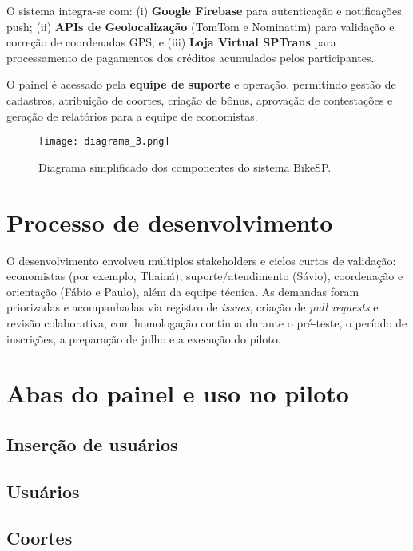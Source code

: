 O sistema integra-se com: (i) \textbf{Google
Firebase} para autenticação e notificações push; (ii) \textbf{APIs de
Geolocalização} (TomTom e Nominatim) para validação e correção de coordenadas
GPS; e (iii) \textbf{Loja Virtual SPTrans} para processamento de pagamentos dos
créditos acumulados pelos participantes.

O painel é acessado pela \textbf{equipe de suporte} e
operação, permitindo gestão de cadastros, atribuição de coortes, criação de
bônus, aprovação de contestações e geração de relatórios para a equipe de
economistas.

\begin{figure}[H]
  \centering
  \texttt{[image: diagrama\_3.png]}
  \caption{Diagrama simplificado dos componentes do sistema BikeSP.}
  \label{fig:arquitetura}
\end{figure}

\section{Processo de desenvolvimento}
\label{sec:processo-desenvolvimento}
O desenvolvimento envolveu múltiplos stakeholders e ciclos curtos de validação:
economistas (por exemplo, Thainá), suporte/atendimento (Sávio), coordenação e
orientação (Fábio e Paulo), além da equipe técnica. As demandas foram
priorizadas e acompanhadas via registro de \textit{issues}, criação de
\textit{pull requests} e revisão colaborativa, com homologação contínua durante
o pré-teste, o período de inscrições, a preparação de julho e a execução do
piloto.

\section{Abas do painel e uso no piloto}
\label{sec:abas-painel}

\subsection{Inserção de usuários}


\subsection{Usuários}



\subsection{Coortes}



